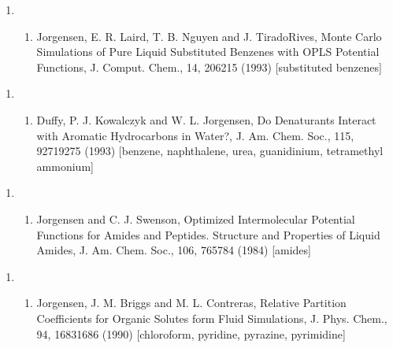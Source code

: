 \documentclass[letterpaper,11pt,english]{sphinxmanual}
\begin{document}
\begin{enumerate}
%
\setcounter{enumi}{22}
\item {} \begin{enumerate}
%
\setcounter{enumii}{11}
\item {} 
Jorgensen, E. R. Laird, T. B. Nguyen and J. Tirado\sphinxhyphen{}Rives, Monte Carlo Simulations of Pure Liquid Substituted Benzenes with OPLS Potential Functions, J. Comput. Chem., 14, 206\sphinxhyphen{}215 (1993)  {[}substituted benzenes{]}

\end{enumerate}

\end{enumerate}
\begin{enumerate}
%
\setcounter{enumi}{4}
\item {} \begin{enumerate}
%
\setcounter{enumii}{12}
\item {} 
Duffy, P. J. Kowalczyk and W. L. Jorgensen, Do Denaturants Interact with Aromatic Hydrocarbons in Water?, J. Am. Chem. Soc., 115, 9271\sphinxhyphen{}9275 (1993)  {[}benzene, naphthalene, urea, guanidinium, tetramethyl ammonium{]}

\end{enumerate}

\end{enumerate}
\begin{enumerate}
%
\setcounter{enumi}{22}
\item {} \begin{enumerate}
%
\setcounter{enumii}{11}
\item {} 
Jorgensen and C. J. Swenson, Optimized Intermolecular Potential Functions for Amides and Peptides. Structure and Properties of Liquid Amides, J. Am. Chem. Soc., 106, 765\sphinxhyphen{}784 (1984)  {[}amides{]}

\end{enumerate}

\end{enumerate}
\begin{enumerate}
%
\setcounter{enumi}{22}
\item {} \begin{enumerate}
%
\setcounter{enumii}{11}
\item {} 
Jorgensen, J. M. Briggs and M. L. Contreras, Relative Partition Coefficients for Organic Solutes form Fluid Simulations, J. Phys. Chem., 94, 1683\sphinxhyphen{}1686 (1990)  {[}chloroform, pyridine, pyrazine, pyrimidine{]}

\end{enumerate}

\end{enumerate}
\end{document}

